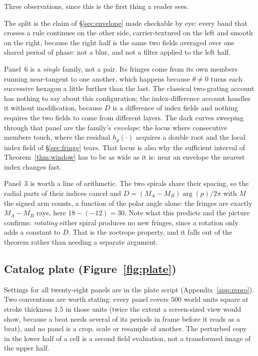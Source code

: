 Three observations, since this is the first thing a reader sees.

The split is the claim of \S\ref{sec:envelope} made checkable by eye: every
band that crosses a rule continues on the other side, carrier-textured on the
left and smooth on the right, because the right half is the same two fields
averaged over one shared period of phase: not a blur, and not a filter
applied to the left half.

Panel~6 is a \emph{single} family, not a pair. Its fringes come from its own
members running near-tangent to one another, which happens because $\theta\ne0$
turns each successive hexagon a little further than the last. The classical
two-grating account has nothing to say about this configuration; the
index-difference account handles it without modification, because $D$ is a
difference of index fields and nothing requires the two fields to come from
different layers. The dark curves sweeping through that panel are the family's
\emph{envelope}: the locus where consecutive members touch, where the residual
$h_p(\cdot)$ acquires a double root and the local index field of \S\ref{sec:fringe}
tears. That locus is also why the sufficient interval of Theorem~\ref{thm:window}
has to be as wide as it is: near an envelope the nearest index changes fast.

Panel~3 is worth a line of arithmetic. The two spirals share their spacing, so
the radial parts of their indices cancel and $D=(M_A-M_B)\arg(p)/2\pi$ with
$M$ the signed arm counts, a function of the polar angle alone: the fringes
are exactly $M_A-M_B$ rays, here $18-(-12)=30$.
Note what this predicts and the picture confirms: \emph{rotating} either
spiral produces no new fringes, since a rotation only
adds a constant to $D$. That is the zoetrope property, and it falls out of the
theorem rather than needing a separate argument.

\subsection{Catalog plate (Figure~\ref{fig:plate})}

Settings for all twenty-eight panels are in the plate script
(Appendix~\ref{app:repro}). Two conventions are worth stating: every panel covers
$500$ world units square at stroke thickness $1.5$ in those units (twice the
extent a screen-sized view would show, because a beat needs several of its periods
in frame before it reads as a beat), and no panel is a crop, scale or resample of
another. The perturbed copy in the lower half of a cell is a second field
evaluation, not a transformed image of the upper half.

